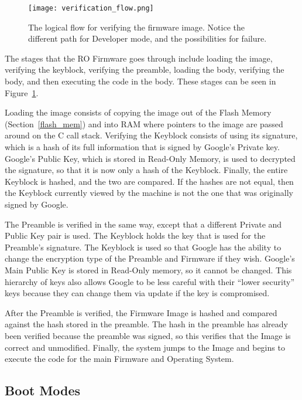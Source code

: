 \documentclass[../report.tex]{subfiles}
\begin{document}
\begin{figure}
  \centering
  \texttt{[image: verification\_flow.png]}
  \caption{The logical flow for verifying the firmware image. Notice
  the different path for Developer mode, and the possibilities for
  failure.}\label{fig:verif_flow}
\end{figure}

The stages that the RO Firmware goes through include loading the image, verifying the keyblock, verifying the preamble, loading the body, verifying the body, and then executing the code in the body. 
These stages can be seen in Figure~\ref{fig:verif_flow}.

Loading the image consists of copying the image out of the Flash Memory (Section~\ref{flash_mem}) and into RAM where pointers to the image are passed around on the C call stack.
Verifying the Keyblock consists of using its signature, which is a hash of its full information that is signed by Google's Private key.
Google's Public Key, which is stored in Read-Only Memory, is used to decrypted the signature, so that it is now only a hash of the Keyblock.
Finally, the entire Keyblock is hashed, and the two are compared.
If the hashes are not equal, then the Keyblock currently viewed by the machine is not the one that was originally signed by Google.

The Preamble is verified in the same way, except that a different Private and Public Key pair is used.
The Keyblock holds the key that is used for the Preamble's signature.
The Keyblock is used so that Google has the ability to change the encryption
type of the Preamble and Firmware if they wish.
Google's Main Public Key is stored in Read-Only memory, so it cannot be changed.
This hierarchy of keys also allows Google to be less careful with their ``lower
security'' keys because they can change them via update if the key is
compromised.

After the Preamble is verified, the Firmware Image is hashed and compared
against the hash stored in the preamble. 
The hash in the preamble has already been verified because the preamble was
signed, so this verifies that the Image is correct and unmodified. Finally, the
system jumps to the Image and begins to execute the code for the main Firmware
and Operating System.


\subsection{Boot Modes}\label{sec:boot-modes}
\end{document}
